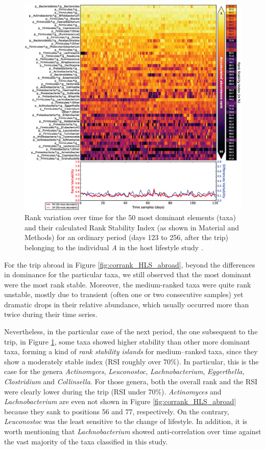 \begin{figure}
	\centering
	\includegraphics[width=1.0\textwidth]{figs/Fig5.eps}
	\caption{Rank variation over time for the 50 most dominant elements (taxa) and their calculated Rank Stability Index (as shown in Material and Methods) for an ordinary period (days 123 to 256, after the trip) belonging to the individual \emph{A} in the host lifestyle study \cite{hostlife}.}
	\label{fig:corrank_HLS_returned}
\end{figure}

For the trip abroad in Figure \ref{fig:corrank_HLS_abroad}, beyond the differences in dominance for the particular taxa, we still observed that the most dominant were the most rank stable. Moreover, the medium-ranked taxa were quite rank unstable, mostly due to transient (often one or two consecutive samples) yet dramatic drops in their relative abundance, which usually occurred more than twice during their time series.

Nevertheless, in the particular case of the next period, the one subsequent to the trip, in Figure \ref{fig:corrank_HLS_returned}, some taxa showed higher stability than other more dominant taxa, forming a kind of \emph{rank stability islands} for medium--ranked taxa, since they show a moderately stable index (RSI roughly over 70\%). In particular, this is the case for the genera \emph{Actinomyces}, \emph{Leuconostoc}, \emph{Lachnobacterium}, \emph{Eggerthella}, \emph{Clostridium} and	\emph{Collinsella}. For those genera, both the overall rank and the RSI were clearly lower during the trip (RSI under 70\%). \emph{Actinomyces} and \emph{Lachnobacterium} are even not shown in Figure \ref{fig:corrank_HLS_abroad} because they sank to positions 56 and 77, respectively. On the contrary, \emph{Leuconostoc} was the least sensitive to the change of lifestyle. In addition, it is worth mentioning that \emph{Lachnobacterium} showed anti-correlation over time against the vast majority of the taxa classified in this study.

